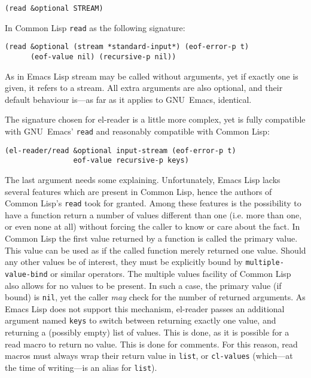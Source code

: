 \documentclass[a4paper,10pt,twoside]{report}
\newcommand{\el}{Emacs Lisp}
\newcommand{\cl}{Common Lisp}
\newcommand{\elr}{el-reader}
\newcommand{\sym}[1]{\texttt{#1}}
\newcommand{\fun}[1]{\texttt{#1}}
\newcommand{\emacs}{GNU~Emacs}
\newcommand{\Read}{\fun{read}}
\begin{document}
\begin{lstlisting}[style=lispinline]
(read &optional STREAM)
\end{lstlisting}

In \cl{} \Read{} as the following signature:

\begin{lstlisting}[style=lispinline]
(read &optional (stream *standard-input*) (eof-error-p t)
      (eof-value nil) (recursive-p nil))
\end{lstlisting}

As in \el{} stream may be called without arguments, yet if exactly one is given,
it refers to a stream.  All extra arguments are also optional, and their default
behaviour is---as far as it applies to \emacs{}, identical.

The signature chosen for \elr{} is a little more complex, yet is fully
compatible with \emacs{}’ \Read{} and reasonably compatible with \cl{}:

\begin{lstlisting}[style=lispinline]
(el-reader/read &optional input-stream (eof-error-p t)
                eof-value recursive-p keys)
\end{lstlisting}

The last argument needs some explaining.  Unfortunately, \el{} lacks several
features which are present in \cl{}, hence the authors of \cl{}’s \Read{} took
for granted.  Among these features is the possibility to have a function return
a number of values different than one (i.e. more than one, or even none at all)
without forcing the caller to know or care about the fact.  In \cl{} the first
value returned by a function is called the primary value.  This value can be
used as if the called function merely returned one value.  Should any other
values be of interest, they must be explicitly bound by
\sym{multiple-value-bind} or similar operators.  The multiple values facility of
\cl{} also allows for no values to be present.  In such a case, the primary
value (if bound) is \sym{nil}, yet the caller \emph{may} check for the number of
returned arguments.  As \el{} does not support this mechanism, \elr{} passes an
additional argument named \sym{keys} to switch between returning exactly one
value, and returning a (possibly empty) list of values.  This is done, as it is
possible for a read macro to return no value.  This is done for comments.  For
this reason, read macros must always wrap their return value in \fun{list}, or
\fun{cl-values} (which---at the time of writing---is an alias for \fun{list}).
\end{document}
